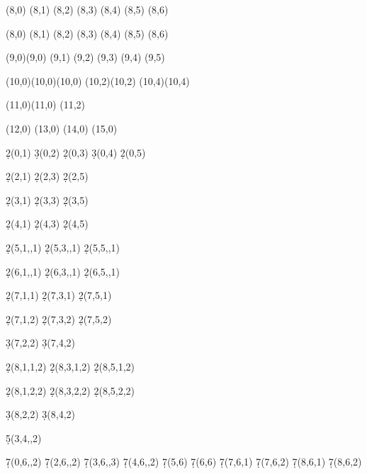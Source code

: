 \documentclass{article}
\begin{document}
\begin{sseqdata}
\class["\iota_2^4"](8,0)
\class["\alpha c"](8,1)
\class["x c"](8,2)
\class["\alpha x c"](8,3)
\class["x^2 c"](8,4)
\class["\alpha x^2 c"](8,5)
\class["x^3 c"](8,6)

(8,0)
\class["\alpha d"](8,1)
\class["x d"](8,2)
\class["\alpha x d"](8,3)
\class["x^2 d"](8,4)
\class["\alpha x^2 d"](8,5)
\class["x^3 d"](8,6)

\class(9,0)\class(9,0)
\class(9,1)
\class(9,2)
\class(9,3)
\class(9,4)
\class(9,5)

\class(10,0)\class(10,0)\class(10,0)
\class(10,2)\class(10,2)
\class(10,4)\class(10,4)

\class(11,0)\class(11,0)
\class(11,2)

\class(12,0)
\class(13,0)
\class(14,0)
\class(15,0)


\d2(0,1) %
\d3(0,2) %
\d2(0,3) %
\d3(0,4) %
\d2(0,5) %


\d2(2,1) %
\d2(2,3) %
\d2(2,5) %

\d2(3,1) %
\d2(3,3)
\d2(3,5)

\d2(4,1) %
\d2(4,3)
\d2(4,5)

\d2(5,1,,1) %
\d2(5,3,,1)
\d2(5,5,,1)

\d2(6,1,,1) %
\d2(6,3,,1)
\d2(6,5,,1)

\d2(7,1,1)  %
\d2(7,3,1)
\d2(7,5,1)

\d2(7,1,2) %
\d2(7,3,2)
\d2(7,5,2)

\d3(7,2,2) %
\d3(7,4,2)

\d2(8,1,1,2) %
\d2(8,3,1,2)
\d2(8,5,1,2)

\d2(8,1,2,2) %
\d2(8,3,2,2)
\d2(8,5,2,2)

\d3(8,2,2) %
\d3(8,4,2)


\d5(3,4,,2) %

\d7(0,6,,2) %
\d7(2,6,,2)
\d7(3,6,,3)
\d7(4,6,,2)
\d7(5,6)
\d7(6,6)
\d7(7,6,1)
\d7(7,6,2)
\d7(8,6,1)
\d7(8,6,2)


\end{sseqdata}

\printpage[name=K(Z/3;2),page=2]
\newpage
\printpage[name=K(Z/3;2),page=3]
\newpage
\printpage[name=K(Z/3;2),page=5]
\newpage
\printpage[name=K(Z/3;2),page=6]
\newpage
\printpage[name=K(Z/3;2),page=7]
\newpage
\end{document}
